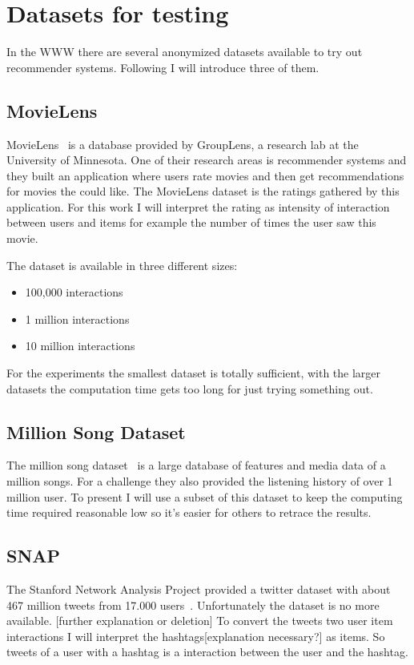 \section{Datasets for testing}

In the WWW there are several anonymized datasets available to try
out recommender systems. Following I will introduce three of them.


\subsection{MovieLens}
\label{movielens}

MovieLens~\cite{movielensdatasets} is a database provided by GroupLens, a research
lab at the University of Minnesota. One of their research areas is
recommender systems and they built an application where users rate
movies and then get recommendations for movies the could like. The
MovieLens dataset is the ratings gathered by this application. For
this work I will interpret the rating as intensity of interaction
between users and items for example the number of times the user saw
this movie.

The dataset is available in three different sizes:
\begin{itemize}
\item 100,000 interactions
\item 1 million interactions
\item 10 million interactions
\end{itemize}
For the experiments the smallest dataset is totally sufficient, with
the larger datasets the computation time gets too long for just trying
something out.


\subsection{Million Song Dataset}
The million song dataset~\cite{Bertin-Mahieux2011} is a large database of features and media data
of a million songs. For a challenge they also provided the listening history of over 1 million
user. To present I will use a subset of this dataset to keep the computing time required
reasonable low so it's easier for others to retrace the results.


\subsection{SNAP}
The Stanford Network Analysis Project provided a twitter dataset with about 467 million tweets from 17.000 users~\cite{snap}.
Unfortunately the dataset is no more available. [further explanation or deletion]
To convert the tweets two user item interactions I will interpret the hashtags[explanation necessary?] as items.
So tweets of a user with a hashtag is a interaction between the user and the hashtag.
